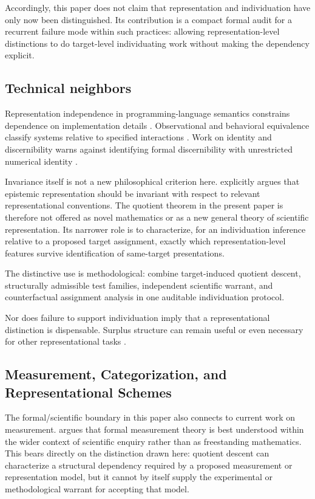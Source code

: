 \documentclass[11pt]{article}
\begin{document}
Accordingly, this paper does not claim that representation and individuation have only now been distinguished. Its contribution is a compact formal audit for a recurrent failure mode within such practices: allowing representation-level distinctions to do target-level individuating work without making the dependency explicit.

\subsection{Technical neighbors}

Representation independence in programming-language semantics constrains dependence on implementation details \citep{Mitchell1986RepresentationIndependence}. Observational and behavioral equivalence classify systems relative to specified interactions \citep{HennessyMilner1985,Rutten2000UniversalCoalgebra}. Work on identity and discernibility warns against identifying formal discernibility with unrestricted numerical identity \citep{LadymanLinneboPettigrew2012,DieksVersteegh2008}.

Invariance itself is not a new philosophical criterion here. \citet{Liu2015Invariance} explicitly argues that epistemic representation should be invariant with respect to relevant representational conventions. The quotient theorem in the present paper is therefore not offered as novel mathematics or as a new general theory of scientific representation. Its narrower role is to characterize, for an individuation inference relative to a proposed target assignment, exactly which representation-level features survive identification of same-target presentations.

The distinctive use is methodological: combine target-induced quotient descent, structurally admissible test families, independent scientific warrant, and counterfactual assignment analysis in one auditable individuation protocol.

Nor does failure to support individuation imply that a representational distinction is dispensable. Surplus structure can remain useful or even necessary for other representational tasks \citep{NguyenTehWells2020Surplus}.

\subsection{Measurement, Categorization, and Representational Schemes}

The formal/scientific boundary in this paper also connects to current work on measurement. \citet{Rizza2025Measurement} argues that formal measurement theory is best understood within the wider context of scientific enquiry rather than as freestanding mathematics. This bears directly on the distinction drawn here: quotient descent can characterize a structural dependency required by a proposed measurement or representation model, but it cannot by itself supply the experimental or methodological warrant for accepting that model.
\end{document}
